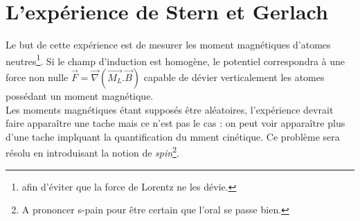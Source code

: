 \documentclass	[11pt, a4paper, openany]{book}
\begin{document}
	\section{L'expérience de Stern et Gerlach}
	Le but de cette expérience est de mesurer les moment magnétiques d'atomes neutres\footnote{
	afin d'éviter que la force de Lorentz ne les dévie.}. Si le champ d'induction est
	homogène, le potentiel correspondra à une force non nulle $\vec{F} = \vec{\nabla}(
	\vec{M_L}.\vec{B})$ capable de dévier verticalement les atomes possédant un moment 
	magnétique.\\
	Les moments magnétiques étant supposés \^etre aléatoires, l'expérience devrait faire
	appara\^itre une tache mais ce n'est pas le cas : on peut voir apparaître plus d'une
	tache implquant la quantification du mment cinétique. Ce problème sera résolu en 
	introduisant la notion de \textit{spin}\footnote{A prononcer s-pain pour être certain
	que l'oral se passe bien.}.
\end{document}
